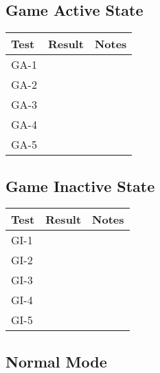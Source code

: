 \documentclass[12pt, titlepage]{article}
\begin{document}
\subsection{Game Active State}

\begin{table}[H]
  \centering
      \setlength{\leftmargini}{0.4cm}
      \begin{tabular}{| >{\centering\arraybackslash}m{3cm} | 
        >{\centering\arraybackslash}m{4cm} | 
        >{\centering\arraybackslash}m{6cm} |}
      \hline
      \rowcolor[gray]{0.9}
      Test & Result & Notes\\
      \hline
      GA-1 &  & \\
      \hline
      GA-2 &  & \\
      \hline
      GA-3 &  & \\
      \hline
      GA-4 &  & \\
      \hline
      GA-5 &  & \\
      \hline
      \end{tabular}
  \label{Table}
  \end{table}

\subsection{Game Inactive State}

\begin{table}[H]
\centering
    \setlength{\leftmargini}{0.4cm}
    \begin{tabular}{| >{\centering\arraybackslash}m{3cm} | 
      >{\centering\arraybackslash}m{4cm} | 
      >{\centering\arraybackslash}m{6cm} |}
    \hline
    \rowcolor[gray]{0.9}
    Test & Result & Notes\\
    \hline
    GI-1 &  & \\
    \hline
    GI-2 &  & \\
    \hline
    GI-3 &  & \\
    \hline
    GI-4 &  & \\
    \hline
    GI-5 &  & \\
    \hline
    \end{tabular}
\label{Table}
\end{table}

\subsection{Normal Mode}
\end{document}
